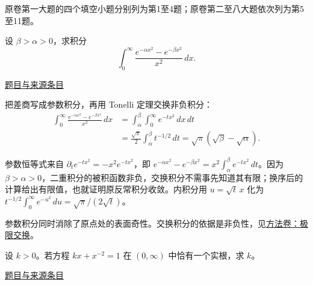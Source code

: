 \documentclass[12pt,fontset=fandol]{ctexart}
\begin{document}
\begin{remark}[来源说明]原卷第一大题的四个填空小题分别列为第1至4题；原卷第二至八大题依次列为第5至11题。\end{remark}

\begin{example}[来源序号1]\label{ex:fin01-all:1}\label{pr:fin01-all:1}

设 $\beta>\alpha>0$，求积分
\[
\int_0^\infty\frac{e^{-\alpha x^2}-e^{-\beta x^2}}{x^2}\,dx.
\]

\par\href{https://github.com/lzxcr/cmc-mathematics/blob/64916fa1fdbc3e444a652eca204d5669058ee321/src/problems/finals/01/01.md}{题目与来源条目}

\end{example}

\begin{solve}\label{ans:fin01-all:1}

把差商写成参数积分，再用 Tonelli 定理交换非负积分：
\[
\begin{aligned}
\int_0^\infty\frac{e^{-\alpha x^2}-e^{-\beta x^2}}{x^2}\,dx
&=\int_\alpha^\beta\int_0^\infty e^{-t x^2}\,dx\,dt\\
&=\frac{\sqrt\pi}{2}\int_\alpha^\beta t^{-1/2}\,dt
=\sqrt\pi(\sqrt\beta-\sqrt\alpha).
\end{aligned}
\]

参数恒等式来自 $\partial_t e^{-tx^2}=-x^2e^{-tx^2}$，即 $e^{-\alpha x^2}-e^{-\beta x^2}=x^2\int_\alpha^\beta e^{-tx^2}\,dt$。因为 $\beta>\alpha>0$，二重积分的被积函数非负，交换积分不需事先知道其有限；换序后的计算给出有限值，也就证明原反常积分收敛。内积分用 $u=\sqrt t\,x$ 化为 $t^{-1/2}\int_0^\infty e^{-u^2}\,du=\sqrt\pi/(2\sqrt t)$。

\end{solve}

\begin{remark}[方法与条件]参数积分同时消除了原点处的表面奇性。交换积分的依据是非负性，见\hyperref[app:integration-exchange]{方法卷：极限交换}。\end{remark}

\begin{example}[来源序号2]\label{ex:fin01-all:2}\label{pr:fin01-all:2}

设 $k>0$。若方程 $kx+x^{-2}=1$ 在 $(0,\infty)$ 中恰有一个实根，求 $k$。

\par\href{https://github.com/lzxcr/cmc-mathematics/blob/64916fa1fdbc3e444a652eca204d5669058ee321/src/problems/finals/01/02.md}{题目与来源条目}

\end{example}
\end{document}
